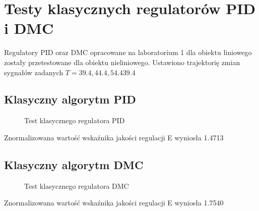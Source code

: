 \section{Testy klasycznych regulatorów PID i DMC}
\label{lab:zad3}

Regulatory PID oraz DMC opracowane na laboratorium 1 dla obiektu liniowego
zostały przetestowane dla obiektu nieliniowego. Ustawiono trajektorię zmian
sygnałów zadanych $T= 39.4, 44.4, 54.4 39.4$


\subsection{Klasyczny algorytm PID}
\label{lab:zad3:PID}

\begin{figure}[H] 
   \centering
   
   \caption{Test klasycznego regulatora PID}
   \label{lab:zad3:PID:figure}
\end{figure}

Znormalizowana wartość wskaźnika jakości regulacji E wyniosła \num{1.4713}
\newpage

\subsection{Klasyczny algorytm DMC}
\label{lab:zad3:DMC}

\begin{figure}[H] 
    \centering
    
    \caption{Test klasycznego regulatora DMC}
    \label{lab:zad3:DMC:figure}
\end{figure}

Znormalizowana wartość wskaźnika jakości regulacji E wyniosła \num{1.7540}


\newpage
